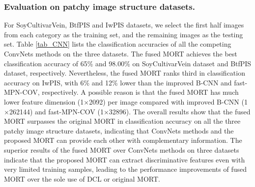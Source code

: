 \documentclass[letterpaper]{article} %
\begin{document}
\subsubsection{Evaluation on patchy image structure datasets.}
For SoyCultivarVein, BtfPIS and IwPIS datasets, we select the first half images from each category as the training set, and the remaining images as the testing set. Table 
\ref{tab_CNN} lists the classification accuracies of all the competing ConvNets methods on the three datasets. The fused MORT achieves the best classification accuracy of 65\% and 98.00\% on SoyCultivarVein dataset and BtfPIS dataset, respectively. Nevertheless, the fused MORT ranks third in classification accuracy on IwPIS, with 6\% and 12\% lower than the improved B-CNN and fast-MPN-COV, respectively. A possible reason is that the fused MORT has much lower feature dimension (1$\times$2092) per image compared with improved B-CNN (1$\times$262144) and fast-MPN-COV (1$\times$32896). The overall results show that the fused MORT surpasses the original MORT in classification accuracy on all the three patchy image structure datasets, indicating that ConvNets methods and the proposed MORT can provide each other with complementary information. The superior results of the fused MORT over ConvNets methods on three datasets indicate that the proposed MORT can extract discriminative features even with very limited training samples, leading to the performance improvements of fused MORT over the sole use of DCL or original MORT.
\end{document}
